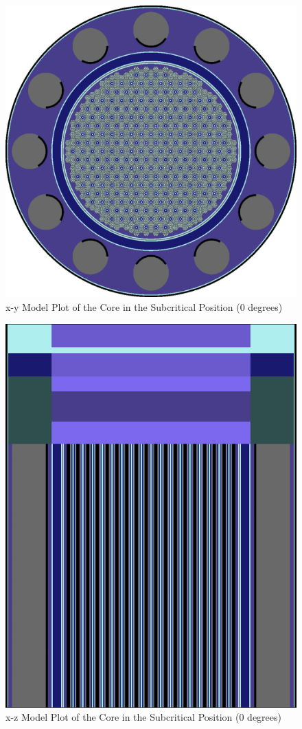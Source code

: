 \documentclass[8pt,a4paper]{article}
\begin{document}
\begin{figure}[h!]
    \centering
    \includegraphics[width=1\linewidth]{figures/xy0_Reactor.png}
    \caption{x-y Model Plot of the Core in the Subcritical Position (0 degrees)}
    \label{fig:Figure 1}
\end{figure}

\begin{figure}[h!]
    \centering
    \includegraphics[width=1\linewidth]{figures/xz0_Reactor.png}
    \caption{x-z Model Plot of the Core in the Subcritical Position (0 degrees)}
    \label{fig:Figure 2}
\end{figure}
\end{document}
